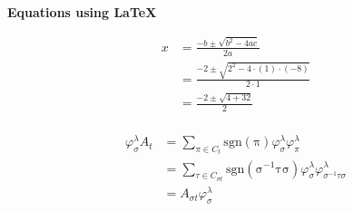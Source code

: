 \documentclass[12pt,a4paper]{article}
\begin{document}
\begin{center}
    \large{\textbf{Equations using \LaTeX}}
\end{center}

\begin{minipage}[t]{0.48\textwidth}
\begin{align*}
    x &= \frac{-b \pm \sqrt{b^{2}-4ac}}{2a}\\
    & = \frac{-2\pm \sqrt{2^{2}-4\cdot(1)\cdot(-8)}}{2\cdot1}\\
    & = \frac{-2 \pm \sqrt{4+32}}{2}\\
\end{align*}

\end{minipage}
\hfill
\begin{minipage}[t]{0.48\textwidth}
    \begin{align*}
        \varphi^{\lambda}_{\sigma}A_{t} &= \sum_{\pi \in C_{t}}\operatorname{sgn(\pi)}\varphi^{\lambda}_{\sigma}\varphi^{\lambda}_{\pi}\\
        &= \sum_{\tau \in C_{\sigma t}}\operatorname{sgn(\sigma^{-1}\tau \sigma)}\varphi^{\lambda}_{\sigma}\varphi^{\lambda}_{\sigma^{-1}\tau \sigma}\\
        &= A_{\sigma t}\varphi^{\lambda}_{\sigma}\\
    \end{align*}
\end{minipage}
\end{document}
